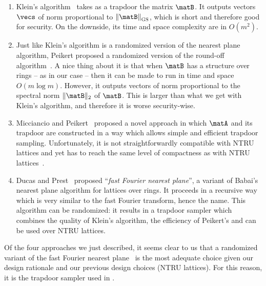 \begin{enumerate}
 \item Klein's algorithm~\cite{SODA:Klein00} takes as a trapdoor the matrix $\matB$. It outputs vectors $\vecs$ of norm proportional to $\gsnorm{\matB}$, which is short and therefore good for security. On the downside, its time and space complexity are in $O(m^2)$.

 \item Just like Klein's algorithm is a randomized version of the nearest plane algorithm, Peikert proposed a randomized version of the round-off algorithm~\cite{C:Peikert10}. A nice thing about it is that when $\matB$ has a structure over rings -- as in our case -- then it can be made to run in time and space $O(m \log m)$. However, it outputs vectors of norm proportional to the spectral norm $\|\matB\|_2$ of $\matB$. This is larger than what we get with Klein's algorithm, and therefore it is worse security-wise.

 \item Micciancio and Peikert~\cite{EC:MicPei12} proposed a novel approach in which $\matA$ and its trapdoor are constructed in a way which allows simple and efficient trapdoor sampling. Unfortunately, it is not straightforwardly compatible with NTRU lattices and yet has to reach the same level of compactness as with NTRU lattices~\cite{AC:CheGenMuk19}.

 \item Ducas and Prest~\cite{ISSAC:DucPre16} proposed ``\textit{fast Fourier nearest plane}'', a variant of Babai's nearest plane algorithm for lattices over rings. It proceeds in a recursive way which is very similar to the fast Fourier transform, hence the name. This algorithm can be randomized: it results in a trapdoor sampler which combines the quality of Klein's algorithm, the efficiency of Peikert's and can be used over NTRU lattices.
\end{enumerate}

Of the four approaches we just described, it seems clear to us that a randomized variant of the fast Fourier nearest plane~\cite{ISSAC:DucPre16} is the most adequate choice given our design rationale and our previous design choices (NTRU lattices). For this reason, it is the trapdoor sampler used in \falcon.

